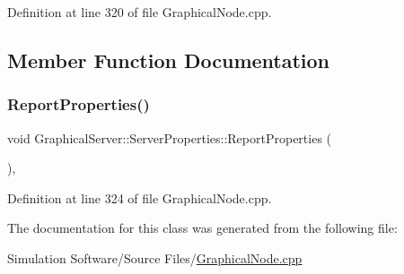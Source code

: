 Definition at line 320 of file Graphical\+Node.\+cpp.



\subsection{Member Function Documentation}
\mbox{\label{class_graphical_server_1_1_server_properties_a6bf00d11d4a62c51f661d5f915bdf8e0}} 
\subsubsection{\texorpdfstring{Report\+Properties()}{ReportProperties()}}
{\footnotesize\ttfamily void Graphical\+Server\+::\+Server\+Properties\+::\+Report\+Properties (\begin{DoxyParamCaption}{ }\end{DoxyParamCaption})\hspace{0.3cm}{\ttfamily [inline]}, {\ttfamily [override]}}



Definition at line 324 of file Graphical\+Node.\+cpp.



The documentation for this class was generated from the following file\+:\begin{DoxyCompactItemize}
\item 
Simulation Software/\+Source Files/\hyperlink{_graphical_node_8cpp}{Graphical\+Node.\+cpp}\end{DoxyCompactItemize}
